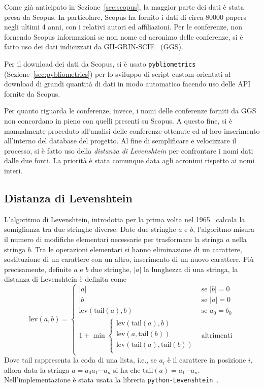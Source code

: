 Come già anticipato in Sezione~\ref{sec:scopus}, la maggior parte dei dati è
stata presa da Scopus. In particolare, Scopus ha fornito i dati di circa 80000
papers negli ultimi 4 anni, con i relativi autori ed affiliazioni.
Per le conferenze, non fornendo Scopus informazioni se non nome ed acronimo
delle conferenze, si è fatto uso dei dati indicizzati da GII-GRIN-SCIE~\cite{giigrinscie} (GGS).

Per il download dei dati da Scopus, si è usato \texttt{pybliometrics}
(Sezione~\ref{sec:pybliometrics}) per lo sviluppo di script custom orientati
al download di grandi quantità di dati in modo automatico facendo uso delle
API fornite da Scopus.

Per quanto riguarda le conferenze, invece, i nomi delle conferenze forniti da
GGS non concordano in pieno con quelli presenti su Scopus. A questo fine,
si è manualmente proceduto all'analisi delle conferenze ottenute ed al loro
inserimento all'interno del database del progetto.
Al fine di semplificare e velocizzare il processo, si è fatto uso della
\textit{distanza di Levenshtein} per confrontare i nomi dati dalle due fonti.
La priorità è stata comunque data agli acronimi rispetto ai nomi interi.

\subsection{Distanza di Levenshtein}

L'algoritmo di Levenshtein, introdotta per la prima volta nel
1965~\cite{levenshtein1966} calcola la somiglianza tra due stringhe diverse.
Date due stringhe $a$ e $b$, l'algoritmo misura il numero di modifiche
elementari necessarie per trasformare la stringa $a$ nella stringa $b$.
Tra le operazioni elementari si hanno eliminazione di un carattere,
sostituzione di un carattere con un altro, inserimento di un nuovo carattere.
Più precisamente, definite $a$ e $b$ due stringhe, $|a|$ la lunghezza di una
stringa, la distanza di Levenshtein è definita come
\begin{equation*}
  \text{lev}(a, b) =
  \begin{cases}
    |a| & \text{se } |b| = 0 \\
    |b| & \text{se } |a| = 0 \\
    \text{lev}(\text{tail}(a), b) & \text{se } a_0 = b_0 \\
    1 + \min\begin{cases}
      \text{lev}(\text{tail}(a), b) \\
      \text{lev}(a, \text{tail}(b)) \\
      \text{lev}(\text{tail}(a), \text{tail}(b)) \\
    \end{cases}
    & \text{altrimenti}
  \end{cases}
\end{equation*}
%
Dove $\text{tail}$ rappresenta la coda di una lista, i.e., se $a_i$ è il
carattere in posizione $i$, allora data la stringa $a = a_0a_1\cdots a_n$ si ha
che $\text{tail}(a) = a_1\cdots a_n$.
Nell'implementazione è stata usata la libreria
\texttt{python-Levenshtein}~\cite{pythonLevenshtein}.

